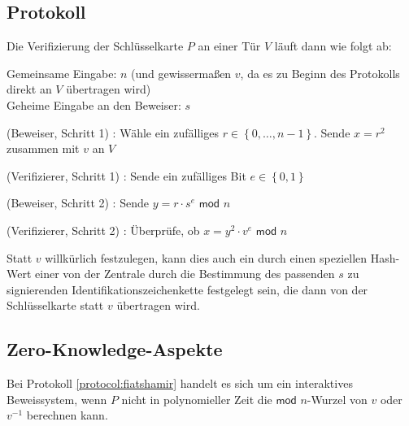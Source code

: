 
\subsection{Protokoll}
Die Verifizierung der Schlüsselkarte \( P \) an einer Tür \( V \) läuft dann wie folgt ab:

\vspace{0.2cm}
\begin{protocol}
Gemeinsame Eingabe: \( n \) (und gewissermaßen \( v \), da es zu Beginn des Protokolls direkt an \( V \) übertragen wird)\\
Geheime Eingabe an den Beweiser: \( s \)
\label{protocol:fiatshamir}
\item[(Beweiser, Schritt 1)]: Wähle ein zufälliges \( r \in \left\lbrace 0, \dots, n - 1 \right\rbrace \). Sende \( x = r^{2} \) zusammen mit \( v \) an \( V \)
\item[(Verifizierer, Schritt 1)]:  Sende ein zufälliges Bit \( e \in \left\lbrace 0, 1 \right\rbrace \)
\item[(Beweiser, Schritt 2)]: Sende \( y = r \cdot s^e \textsf{ mod } n \)
\item[(Verifizierer, Schritt 2)]: Überprüfe, ob \( x = y^2 \cdot v^e \textsf{ mod } n \)
\end{protocol}

Statt \( v \) willkürlich festzulegen, kann dies auch ein durch einen speziellen \glqq{}Hash-Wert\grqq{} einer von der Zentrale durch die Bestimmung des passenden \(s \) zu signierenden Identifikationszeichenkette festgelegt sein, die dann von der Schlüsselkarte statt \( v \) übertragen wird.

\subsection{Zero-Knowledge-Aspekte}

\begin{theorem}
Bei Protokoll \ref{protocol:fiatshamir} handelt es sich um ein interaktives Beweissystem, wenn \( P \) nicht in polynomieller Zeit die \( \textsf{mod } n \)-Wurzel von \( v \) oder \( v^{-1} \) berechnen kann.
\end{theorem}

